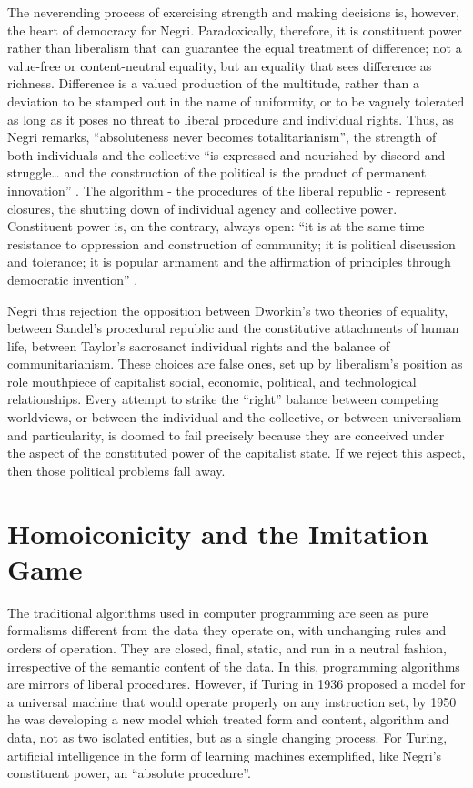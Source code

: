 \documentclass[12pt,oneside]{memoir}
\begin{document}
The neverending process of exercising strength and making decisions is, however, the heart of democracy for Negri. Paradoxically, therefore, it is constituent power rather than liberalism that can guarantee the equal treatment of difference; not a value-free or content-neutral equality, but an equality that sees difference as richness. Difference is a valued production of the multitude, rather than a deviation to be stamped out in the name of uniformity, or to be vaguely tolerated as long as it poses no threat to liberal procedure and individual rights. Thus, as Negri remarks, ``absoluteness never becomes totalitarianism'', the strength of both individuals and the collective ``is expressed and nourished by discord and struggle{\ldots} and the construction of the political is the product of permanent innovation'' \citep[29]{Negri1999}. The algorithm - the procedures of the liberal republic - represent closures, the shutting down of individual agency and collective power. Constituent power is, on the contrary, always open: ``it is at the same time resistance to oppression and construction of community; it is political discussion and tolerance; it is popular armament and the affirmation of principles through democratic invention'' \cite[29]{Negri1999}.
	
Negri thus rejection the opposition between Dworkin's two theories of equality, between Sandel's procedural republic and the constitutive attachments of human life, between Taylor's sacrosanct individual rights and the balance of communitarianism. These choices are false ones, set up by liberalism's position as role mouthpiece of capitalist social, economic, political, and technological relationships. Every attempt to strike the ``right'' balance between competing worldviews, or between the individual and the collective, or between universalism and particularity, is doomed to fail precisely because they are conceived under the aspect of the constituted power of the capitalist state. If we reject this aspect, then those political problems fall away.


\section{Homoiconicity and the Imitation Game}

The traditional algorithms used in computer programming are seen as pure formalisms different from the data they operate on, with unchanging rules and orders of operation. They are closed, final, static, and run in a neutral fashion, irrespective of the semantic content of the data. In this, programming algorithms are mirrors of liberal procedures. However, if Turing in 1936 proposed a model for a universal machine that would operate properly on any instruction set, by 1950 he was developing a new model which treated form and content, algorithm and data, not as two isolated entities, but as a single changing process. For Turing, artificial intelligence in the form of learning machines exemplified, like Negri's constituent power, an ``absolute procedure''.
	
\end{document}
